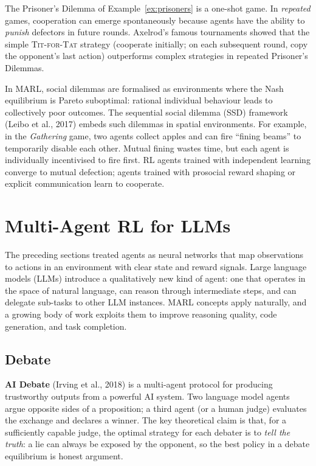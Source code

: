 The Prisoner's Dilemma of Example~\ref{ex:prisoners} is a one-shot
game. In \emph{repeated} games, cooperation can emerge spontaneously
because agents have the ability to \emph{punish} defectors in future
rounds. Axelrod's famous tournaments showed that the simple
\textsc{Tit-for-Tat} strategy (cooperate
initially; on each subsequent round, copy the opponent's last action)
outperforms complex strategies in repeated Prisoner's Dilemmas.

In MARL, social dilemmas are formalised as
environments where the Nash equilibrium is Pareto suboptimal: rational
individual behaviour leads to collectively poor outcomes. The
sequential social dilemma (SSD)
framework (Leibo et al., 2017) embeds such dilemmas in spatial
environments. For example, in the \emph{Gathering} game, two agents
collect apples and can fire ``fining beams'' to temporarily disable
each other. Mutual fining wastes time, but each agent is individually
incentivised to fire first. RL agents trained with independent
learning converge to mutual defection; agents trained with prosocial
reward shaping or explicit communication learn to cooperate.

\section{Multi-Agent RL for LLMs}
\label{sec:marl-llms}

The preceding sections treated agents as neural networks that map
observations to actions in an environment with clear state and reward
signals. Large language models (LLMs)
introduce a qualitatively new kind of agent: one that operates in the
space of natural language, can reason through intermediate steps, and
can delegate sub-tasks to other LLM instances. MARL concepts apply
naturally, and a growing body of work exploits them to improve
reasoning quality, code generation, and task completion.

\subsection{Debate}

\textbf{AI Debate} (Irving et al., 2018) is a
multi-agent protocol for producing trustworthy outputs from a
powerful AI system. Two language model agents argue opposite sides of
a proposition; a third agent (or a human judge) evaluates the
exchange and declares a winner. The key theoretical claim is that,
for a sufficiently capable judge, the optimal strategy for each debater
is to \emph{tell the truth}: a lie can always be exposed by the
opponent, so the best policy in a debate equilibrium is honest argument.


